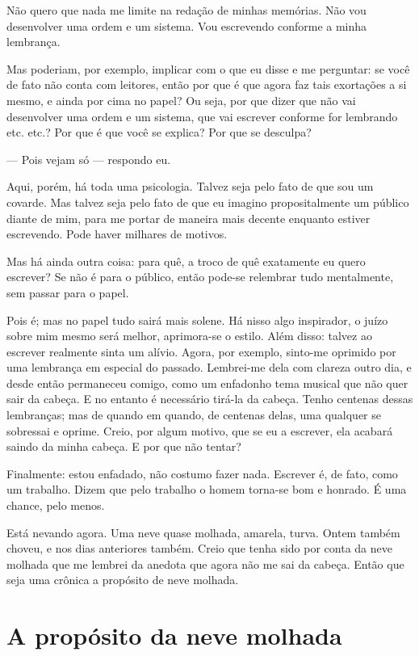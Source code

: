 Não quero que nada me limite na redação de minhas memórias. Não vou
desenvolver uma ordem e um sistema. Vou escrevendo conforme a minha lembrança.

Mas poderiam, por exemplo, implicar com o que eu disse e me perguntar:
se você de fato não conta com leitores, então por que é que agora faz
tais exortações a si mesmo, e ainda por cima no papel? Ou seja, por que
dizer que não vai desenvolver uma ordem e um sistema, que vai escrever
conforme for lembrando etc. etc.? Por que é que você se explica? Por que se
desculpa?

--- Pois vejam só --- respondo eu.

Aqui, porém, há toda uma psicologia. Talvez seja pelo fato de que sou um
covarde. Mas talvez seja pelo fato de que eu imagino propositalmente um
público diante de mim, para me portar de maneira mais decente enquanto
estiver escrevendo. Pode haver milhares de motivos.

Mas há ainda outra coisa: para quê, a troco de quê exatamente eu quero
escrever? Se não é para o público, então pode-se relembrar tudo
mentalmente, sem passar para o papel.

Pois é; mas no papel tudo sairá mais solene. Há nisso algo inspirador, o
juízo sobre mim mesmo será melhor, aprimora-se o estilo. Além disso:
talvez ao escrever realmente sinta um alívio. Agora, por exemplo,
sinto-me oprimido por uma lembrança em especial do passado. Lembrei-me
dela com clareza outro dia, e desde então permaneceu comigo, como um
enfadonho tema musical que não quer sair da cabeça. E no entanto é
necessário tirá-la da cabeça. Tenho centenas dessas lembranças; mas de
quando em quando, de centenas delas, uma qualquer se sobressai e
oprime. Creio, por algum motivo, que se eu a escrever, ela acabará
saindo da minha cabeça. E por que não tentar?

Finalmente: estou enfadado, não costumo fazer nada. Escrever é, de fato,
como um trabalho. Dizem que pelo trabalho o homem torna-se bom e
honrado. É uma chance, pelo menos.

Está nevando agora. Uma neve quase molhada, amarela, turva. Ontem também
choveu, e nos dias anteriores também. Creio que tenha sido por conta da
neve molhada que me lembrei da anedota que agora não me sai da cabeça.
Então que seja uma crônica a propósito de neve molhada.

\chapter{A propósito da neve molhada}

